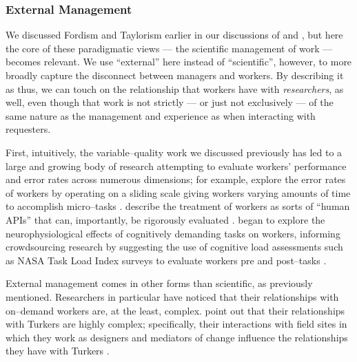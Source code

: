 \documentclass[trackingWork]{subfiles}
\begin{document}
{\begin{appendices}
    \subsubsection{External Management}
    We discussed Fordism and Taylorism earlier in our discussions of
     and ,
    but here the core of these paradigmatic views
    --- the scientific management of work ---
    becomes relevant.
    We use ``external'' here instead of ``scientific'', however,
    to more broadly capture the disconnect between managers and workers.
    By describing it as thus,
    we can touch on the relationship that workers have with \textit{researchers}, as well,
    even though that work is not strictly
    --- or just not exclusively ---
    of the same nature as the management and experience as when interacting with requesters.

    First, intuitively, the variable--quality work we discussed previously has led to
    a large and growing body of research attempting to evaluate workers' performance and error rates
    across numerous dimensions;
    for example, \citeauthor{measuringCrowdsourcingCheng} explore the error rates of workers by
    operating on a sliding scale giving workers varying amounts of time to accomplish micro--tasks
    \cite{measuringCrowdsourcingCheng}.
    \citeauthor{storiesIraniSilberman} describe the treatment of workers
    as sorts of ``human APIs'' that can, importantly, be rigorously evaluated
    \cite{storiesIraniSilberman}.
    \citeauthor{gevins2003neurophysiological} began to explore the neurophysiological effects of
    cognitively demanding tasks on workers,
    informing crowdsourcing research by suggesting the use of cognitive load assessments such as
    NASA Task Load Index surveys to evaluate workers pre and post--tasks
    \cite{embracingErrorKrishna,measuringCrowdsourcingCheng}.


    External management comes in other forms than scientific, as previously mentioned.
    Researchers in particular have noticed that their relationships with on--demand workers are,
    at the least, complex.
    \citeauthor{storiesIraniSilberman} point out that their relationships with Turkers are highly complex;
    specifically, their interactions with field sites in which they work
    as designers and mediators of change influence the relationships they have with Turkers
    \cite{storiesIraniSilberman}.


\end{appendices}}
\end{document}
